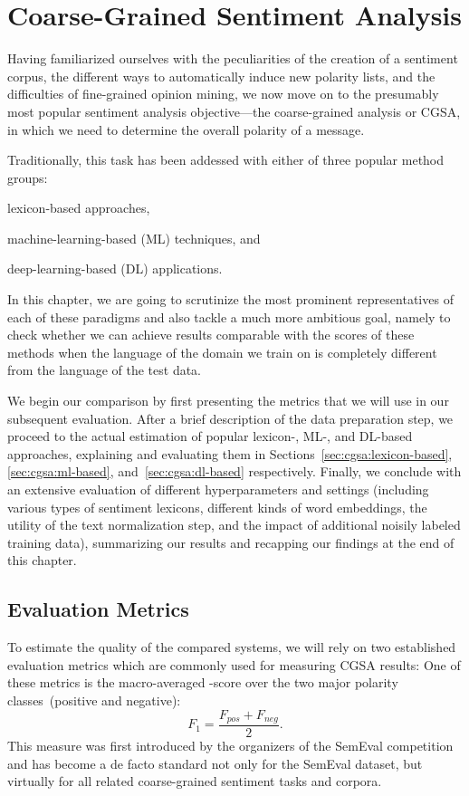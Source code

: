 \chapter{Coarse-Grained Sentiment Analysis}\label{sec:snt:cgsa}

Having familiarized ourselves with the peculiarities of the creation
of a sentiment corpus, the different ways to automatically induce new
polarity lists, and the difficulties of fine-grained opinion mining,
we now move on to the presumably most popular sentiment analysis
objective---the coarse-grained analysis or CGSA, in which we need to
determine the overall polarity of a message.

Traditionally, this task has been addessed with either of three
popular method groups:
\begin{inparaenum}[(i)]
  \item lexicon-based approaches,
  \item machine-learning-based (ML) techniques, and
  \item deep-learning-based (DL) applications.
\end{inparaenum}
In this chapter, we are going to scrutinize the most prominent
representatives of each of these paradigms and also tackle a much more
ambitious goal, namely to check whether we can achieve results
comparable with the scores of these methods when the language of the
domain we train on is completely different from the language of the
test data.

We begin our comparison by first presenting the metrics that we will
use in our subsequent evaluation.  After a brief description of the
data preparation step, we proceed to the actual estimation of popular
lexicon-, ML-, and DL-based approaches, explaining and evaluating them
in Sections~\ref{sec:cgsa:lexicon-based}, \ref{sec:cgsa:ml-based},
and~\ref{sec:cgsa:dl-based} respectively.  Finally, we conclude with
an extensive evaluation of different hyperparameters and settings
(including various types of sentiment lexicons, different kinds of
word embeddings, the utility of the text normalization step, and the
impact of additional noisily labeled training data), summarizing our
results and recapping our findings at the end of this chapter.

\section{Evaluation Metrics}\label{sec:cgsa:eval-metrics}

To estimate the quality of the compared systems, we will rely on two
established evaluation metrics which are commonly used for measuring
CGSA results: One of these metrics is the macro-averaged \F-score over
the two major polarity classes~(positive and negative): { \small%
  \begin{equation*}
    F_1 = \frac{F_{pos} + F_{neg}}{2}.
  \end{equation*}%
  \normalsize%
}%
This measure was first introduced by the organizers of the SemEval
competition~\cite{Nakov:13,Rosenthal:14,Rosenthal:15} and has become a
de facto standard not only for the SemEval dataset, but virtually for
all related coarse-grained sentiment tasks and corpora.


